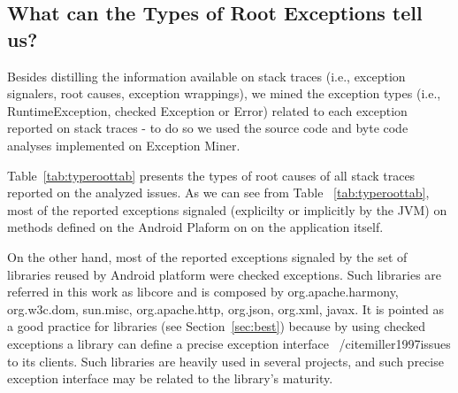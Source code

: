 \documentclass[conference]{IEEEtran}
\begin{document}

\subsection{What can the Types of Root Exceptions tell us?}

Besides distilling the information available on stack traces (i.e., exception signalers, root causes, exception wrappings),
we mined the exception types (i.e., RuntimeException, checked Exception or Error) related to each exception reported on stack traces -
to do so we used the source code and byte code analyses implemented on Exception Miner. 

 Table~\ref{tab:typeroottab} presents the types of root causes of all stack traces reported on the analyzed issues. As we can see 
from Table ~\ref{tab:typeroottab},  most of the reported exceptions signaled (explicilty or implicitly by the JVM) on methods defined
 on the Android Plaform on on the application itself. 

On the other hand, most of the reported exceptions signaled by the set of 
libraries reused by Android platform were checked exceptions. Such libraries are referred in
this work as libcore and is composed by org.apache.harmony, org.w3c.dom, sun.misc, 
org.apache.http, org.json, org.xml, javax. It is pointed as a good practice
for libraries (see Section~\ref{sec:best}) because by using checked exceptions
a library can define a precise exception interface ~/cite{miller1997issues} to its clients. Such
libraries are heavily used in several projects, and such precise exception
interface may be related to the library's maturity.



\end{document}
